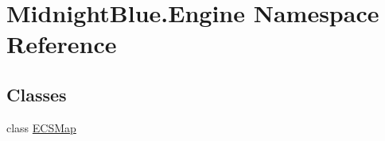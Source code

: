 \hypertarget{namespace_midnight_blue_1_1_engine}{}\section{Midnight\+Blue.\+Engine Namespace Reference}
\label{namespace_midnight_blue_1_1_engine}
\subsection*{Classes}
\begin{DoxyCompactItemize}
\item 
class \hyperlink{class_midnight_blue_1_1_engine_1_1_e_c_s_map}{E\+C\+S\+Map}
\end{DoxyCompactItemize}
